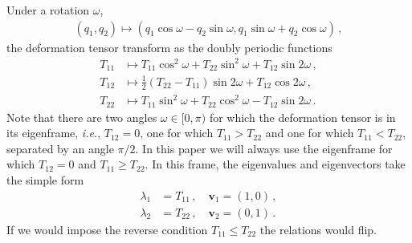 \documentclass[a4paper, 11pt]{article}
\begin{document}
Under a rotation $\omega$, 
\begin{align}
(q_1,q_2) \mapsto  (q_1\cos \omega - q_2 \sin \omega, q_1 \sin \omega + q_2 \cos \omega)\,,
\end{align}
the deformation tensor transform as the doubly periodic functions
\begin{align}
T_{11} &\mapsto T_{11} \cos ^2 \omega  + T_{22} \sin^2 \omega  + T_{12}\sin 2\omega\,,\\
T_{12} &\mapsto \frac{1}{2}(T_{22}-T_{11})\sin 2 \omega + T_{12} \cos 2\omega\,,\\
T_{22} &\mapsto T_{11} \sin ^2 \omega  + T_{22} \cos^2 \omega  - T_{12} \sin 2\omega\,.
\end{align}
Note that there are two angles $\omega \in [0,\pi)$ for which the deformation tensor is in its eigenframe, \textit{i.e.}, $T_{12}=0$, one for which $T_{11}>T_{22}$ and one for which $T_{11}<T_{22}$, separated by an angle $\pi/2$. In this paper we will always use the eigenframe for which $T_{12}=0$ and $T_{11} \geq T_{22}$. In this frame, the eigenvalues and eigenvectors take the simple form 
\begin{align}
\lambda_{1} &= T_{11}\,,\quad \bm{v}_1=(1,0)\,,\\
\lambda_{2} &= T_{22}\,,\quad \bm{v}_2=(0,1)\,.
\end{align}
If we would impose the reverse condition $T_{11} \leq T_{22}$ the relations would flip.
\end{document}
